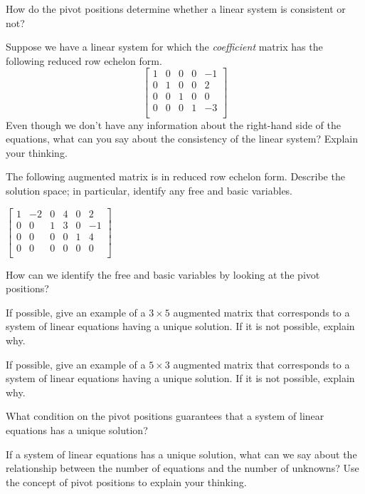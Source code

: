 \documentclass[12pt]{article}
\newcommand{\vs}[1]{\vspace{#1in}}
\begin{document}
\begin{enumerate}
  \vs{1.5}
  How do the pivot positions determine whether a linear system is
  consistent or not?

  \vs{1.1}
  Suppose we have a linear system for
  which the {\em coefficient} matrix has the following
  reduced row echelon form.
  $$
  \left[
    \begin{array}{rrrrr}
      1 & 0 & 0 & 0 & -1 \\
      0 & 1 & 0 & 0 & 2  \\
      0 & 0 & 1 & 0 & 0  \\
      0 & 0 & 0 & 1 & -3 \\
    \end{array}
  \right]
  $$
  Even though we don't have any information about the right-hand side
  of the equations, what can you say about the consistency of the
  linear system?  Explain your thinking.

  \vs{1.1}

  The following augmented matrix is in reduced row echelon form.
  Describe the solution space;  in particular, identify any free and
  basic variables.

  $
  \left[
    \begin{array}{rrrrr|r}
      1 & -2 & 0 & 4 & 0 & 2 \\
      0 & 0 & 1 & 3 & 0 & -1 \\
      0 & 0 & 0 & 0 & 1 & 4 \\
      0 & 0 & 0 & 0 & 0 & 0 \\
    \end{array}
  \right]
  $

  How can we identify the free and basic variables by looking at the
  pivot positions?

  \vs{1.1}
  \newpage
  If possible, give an example of a $3\times5$
  augmented matrix that corresponds to a system of linear equations
  having a unique solution. If it is not possible, explain why.

  \vs{1.1}

  If possible, give an example of a $5\times3$
  augmented matrix that corresponds to a system of linear equations
  having a unique solution. If it is not possible, explain why.

  \vs{1}

  What condition on the pivot positions guarantees that a system of
  linear equations has a unique solution?

  \vs{1}

  If a system of linear equations has a unique solution, what can we
  say about the relationship between the number of equations and the
  number of unknowns?  Use the concept of pivot positions to explain
  your thinking.


\end{enumerate}
\end{document}
